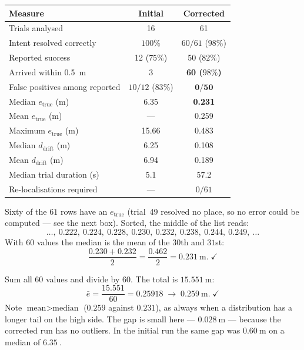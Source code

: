 \documentclass[11pt,a4paper]{report}
\begin{document}
\begin{center}
\small
\begin{tabular}{@{}lcc@{}}
\toprule
\textbf{Measure} & \textbf{Initial} & \textbf{Corrected} \\
\midrule
Trials analysed & 16 & 61 \\
Intent resolved correctly & $100\%$ & $60/61$ ($98\%$) \\
Reported success & 12 ($75\%$) & 50 ($82\%$) \\
Arrived within \SI{0.5}{\metre} & 3 & \textbf{60 ($98\%$)} \\
False positives among reported & $10/12$ ($83\%$) & $\mathbf{0/50}$ \\
Median $e_{\text{true}}$ (\si{\metre}) & 6.35 & \textbf{0.231} \\
Mean $e_{\text{true}}$ (\si{\metre}) & --- & 0.259 \\
Maximum $e_{\text{true}}$ (\si{\metre}) & 15.66 & 0.483 \\
Median $d_{\text{drift}}$ (\si{\metre}) & 6.25 & 0.108 \\
Mean $d_{\text{drift}}$ (\si{\metre}) & 6.94 & 0.189 \\
Median trial duration (\si{\second}) & 5.1 & 57.2 \\
Re-localisations required & --- & $0/61$ \\
\bottomrule
\end{tabular}
\end{center}

\begin{handbox}[Entry 1: median $e_{\text{true}}$ of the corrected run $= 0.231$]
Sixty of the $61$ rows have an $e_{\text{true}}$ (trial~49 resolved no place,
so no error could be computed --- see the next box). Sorted, the middle of the
list reads:
\[
\ldots,\ 0.222,\ 0.224,\ 0.228,\ \mathbf{0.230},\ \mathbf{0.232},\ 0.238,\ 0.244,\ 0.249,\ \ldots
\]
With $60$ values the median is the mean of the $30$th and $31$st:
\[
\frac{0.230 + 0.232}{2} = \frac{0.462}{2} = \SI{0.231}{\metre}. \;\checkmark
\]
\end{handbox}

\begin{handbox}[Entry 2: mean $e_{\text{true}}$ of the corrected run $= 0.259$]
Sum all $60$ values and divide by $60$. The total is $\SI{15.551}{\metre}$:
\[
\bar{e} = \frac{15.551}{60} = 0.25918 \;\rightarrow\; \SI{0.259}{\metre}. \;\checkmark
\]
Note $\text{mean} > \text{median}$ ($0.259$ against $0.231$), as always when a
distribution has a longer tail on the high side. The gap is small here ---
$\SI{0.028}{\metre}$ --- because the corrected run has no outliers. In the
initial run the same gap was $\SI{0.60}{\metre}$ on a median of $\SI{6.35}{}$.
\end{handbox}
\end{document}
